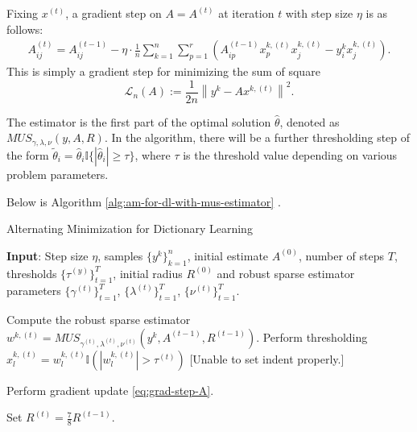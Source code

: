 Fixing $x^{(t)}$, a gradient step on $A = A^{(t)}$ at iteration $t$ with step size $\eta$ is as follows: 
\begin{align}
   A_{ij}^{(t)} = A_{ij}^{(t-1)} - \eta\cdot \frac{1}{n} \sum_{k=1}^n \sum_{p=1}^r \left( A_{ip}^{(t-1)} x_p^{k, (t)} x_j^{k, (t)} - y_i^k x_j^{k, (t)} \right).  \label{eq:grad-step-A}
\end{align}
This is simply a gradient step for minimizing the sum of square
\begin{equation}
    \mathcal{L}_n(A) := \frac{1}{2n} \left\| y^k - A x^{k, (t)} \right\|^2. 
\end{equation}

The estimator is the first part of the optimal solution $\hat{\theta}$, denoted as $MUS_{\gamma,  \lambda, \nu}(y, A, R)$. In the algorithm, there will be a further thresholding step of the form $\tilde{\theta}_i = \hat{\theta}_i \mathbb{I}\{|\hat{\theta}_i| \geq \tau \}$, where $\tau$ is the threshold value depending on various problem parameters.

Below is Algorithm \ref{alg:am-for-dl-with-mus-estimator} \cite{chatterji2017alternating}.

\begin{algorithm}
\caption{Alternating Minimization for Dictionary Learning}
\label{alg:am-for-dl-with-mus-estimator}
\begin{algorithmic}
\STATE \textbf{Input}: Step size $\eta$, samples $\{y^k\}_{k=1}^n$, initial estimate $A^{(0)}$, number of steps $T$, thresholds $\{\tau^{(y)}\}_{t=1}^T$, initial radius $R^{(0)}$ and robust sparse estimator parameters $\{\gamma^{(t)}\}_{t=1}^T$, $\{\lambda^{(t)}\}_{t=1}^T$, $\{\nu^{(t)}\}_{t=1}^T$.\\

    
    Compute the robust sparse estimator $w^{k, (t)} = MUS_{\gamma^{(t)}, \lambda^{(t)}, \nu^{(t)}}(y^k, A^{(t-1)}, R^{(t-1)})$. \newline
    \newline
        Perform thresholding $x^{k, (t)}_l = w_l^{k, (t)} \mathbb{I}\left( |w_l^{k, (t)}| > \tau^{(t)} \right)$ [Unable to set indent properly.]
    \ENDFOR
\ENDFOR

        Perform gradient update \eqref{eq:grad-step-A}.
\ENDFOR
\ENDFOR

Set $R^{(t)} = \frac{7}{8}R^{(t-1)}$. 
\ENDFOR 
\end{algorithmic}
\end{algorithm}


